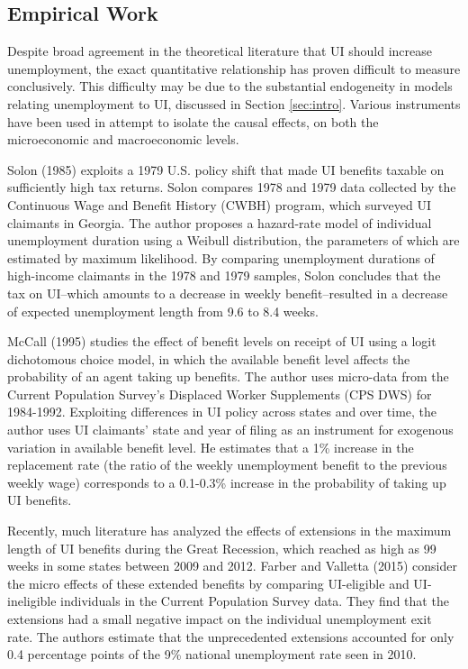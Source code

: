 \documentclass[12pt]{article}
\begin{document}
\subsection{Empirical Work \label{subsec:empirical}}

Despite broad agreement in the theoretical literature that UI should increase unemployment, the exact quantitative relationship has proven difficult to measure conclusively. This difficulty may be due to the substantial endogeneity in models relating unemployment to UI, discussed in Section \ref{sec:intro}. Various instruments have been used in attempt to isolate the causal effects, on both the microeconomic and macroeconomic levels.

Solon (1985) exploits a 1979 U.S. policy shift that made UI benefits taxable on sufficiently high tax returns. Solon compares 1978 and 1979 data collected by the Continuous Wage and Benefit History (CWBH) program, which surveyed UI claimants in Georgia. The author proposes a hazard-rate model of individual unemployment duration using a Weibull distribution, the parameters of which are estimated by maximum likelihood. By comparing unemployment durations of high-income claimants in the 1978 and 1979 samples, Solon concludes that the tax on UI--which amounts to a decrease in weekly benefit--resulted in a decrease of expected unemployment length from 9.6 to 8.4 weeks.

McCall (1995) studies the effect of benefit levels on receipt of UI using a logit dichotomous choice model, in which the available benefit level affects the probability of an agent taking up benefits. The author uses micro-data from the Current Population Survey's Displaced Worker Supplements (CPS DWS) for 1984-1992. Exploiting differences in UI policy across states and over time, the author uses UI claimants' state and year of filing as an instrument for exogenous variation in available benefit level. He estimates that a 1\% increase in the replacement rate (the ratio of the weekly unemployment benefit to the previous weekly wage) corresponds to a 0.1-0.3\% increase in the probability of taking up UI benefits.

Recently, much literature has analyzed the effects of extensions in the maximum length of UI benefits during the Great Recession, which reached as high as 99 weeks in some states between 2009 and 2012. Farber and Valletta (2015) consider the micro effects of these extended benefits by comparing UI-eligible and UI-ineligible individuals in the Current Population Survey data. They find that the extensions had a small negative impact on the individual unemployment exit rate. The authors estimate that the unprecedented extensions accounted for only 0.4 percentage points of the 9\% national unemployment rate seen in 2010.
\end{document}
